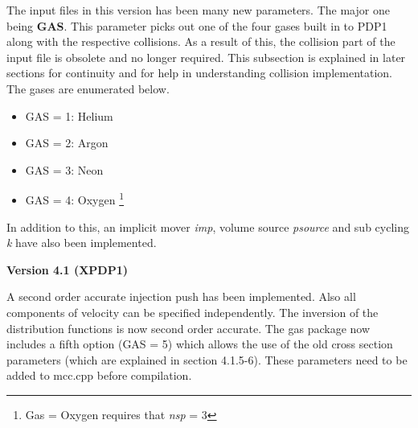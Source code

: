\begin{section}
\begin{subsection}
\begin{subsubsection}
\noindent
      The input files in this version has been many new parameters. The 
      major one being {\bf GAS}. This parameter picks out one of the four
      gases built in to PDP1 along with the respective collisions. As a 
      result of this, the collision part of the input file is obsolete
      and no longer required. This subsection is explained in later sections
      for continuity and for help in understanding collision implementation.
      The gases are enumerated below.
\begin {itemize}
\item	GAS = 1: Helium
\item	GAS = 2: Argon
\item	GAS = 3: Neon 
\item	GAS = 4: Oxygen \footnote{Gas = Oxygen requires that {\em nsp} = 3}
\end {itemize}
	In addition to this, an implicit mover {\em imp}, volume source 
{\em psource} and sub cycling {\em k} have also been implemented.

\end{subsubsection}

\begin{subsubsection}
{\bf Version 4.1 (XPDP1)}

\noindent
	A second order accurate injection push has been implemented.  Also all
	components of velocity can be specified independently.  The inversion
	of the distribution functions is now second order accurate.
	The gas package now includes a fifth option (GAS = 5) which allows
	the use of the old cross section parameters (which are explained
	in section 4.1.5-6).  These parameters need to be added to mcc.cpp 
	before compilation.

\end{subsubsection}

\end{subsection}
\end{section}
\newpage
